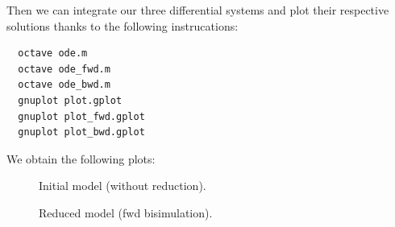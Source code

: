 \documentclass[11pt]{book}
\begin{document}
Then we can integrate our three differential systems and plot their respective  solutions thanks to the following instrucations:
\begin{verbatim}
  octave ode.m
  octave ode_fwd.m
  octave ode_bwd.m
  gnuplot plot.gplot
  gnuplot plot_fwd.gplot
  gnuplot plot_bwd.gplot
\end{verbatim}

We obtain the following plots:
\begin{figure}[htp]
\centering  \begin{minipage}{0.25\linewidth}
\end{minipage}
\caption{Initial model (without reduction).}
\end{figure}

\begin{figure}[htp]
\centering\begin{minipage}{0.25\linewidth}
\end{minipage}
\caption{Reduced model (fwd bisimulation).}
\end{figure}
\end{document}
